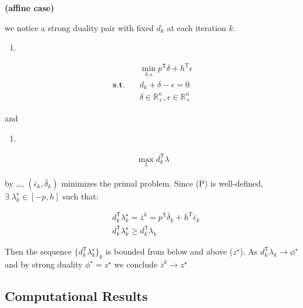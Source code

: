 \documentclass[
  a4paper,
,tablecaptionabove
]{scrartcl}
\numberwithin{equation}{section}
\providecommand{\tightlist}{%
  \setlength{\itemsep}{0pt}\setlength{\parskip}{0pt}}
\begin{document}
\textbf{(affine case)}

we notice a strong duality pair with fixed \(d_k\) at each iteration
\(k\).

\begin{enumerate}
  \def\labelenumi{(\Alph{enumi})}
  \setcounter{enumi}{15}
  \tightlist
  \item
\end{enumerate}

\[\begin{aligned}
                        & \min_{\delta, \epsilon} p^\mathsf{T} \delta + h^\mathsf{T} \epsilon \\
    \mathbf{s.t.} \quad & d_k + \delta - \epsilon = 0                                         \\
                        & \delta \in \mathbb{R}_+^n, \epsilon \in \mathbb{R}_+^n
  \end{aligned}\]

and

\begin{enumerate}
  \def\labelenumi{(\Alph{enumi})}
  \setcounter{enumi}{3}
  \tightlist
  \item
\end{enumerate}

\[\begin{aligned}
    \max_{\lambda} d_k^\mathsf{T} \lambda
  \end{aligned}\]

by \ldots, \((\bar \epsilon_k, \bar \delta_k)\) minimizes the primal
problem. Since (P) is well-defined,
\(\exists\; \lambda_k^\star \in [-p, h]\) such that:

\[\begin{aligned}
     & d_k^\mathsf{T} \lambda_k^\star = \bar z^k = p^\mathsf{T} \bar \delta_k + h^\mathsf{T} \bar \epsilon_k \\
     & d_k^\mathsf{T} \lambda_k^\star \ge  d_k^\mathsf{T} \lambda_k
  \end{aligned}\]

Then the sequence \(\displaystyle\{d_k^\mathsf{T} \lambda_k^\star\}_k\)
is bounded from below and above (\(z^\star\)). As
\(d_k^\mathsf{T} \lambda_k \to \phi^\star\) and by strong duality
\(\phi^\star = z^\star\) we conclude \(\bar z^k \to z^\star\)

\hypertarget{sec:computational-results}{%
  \subsection{Computational Results}\label{computational-results}}
\end{document}
